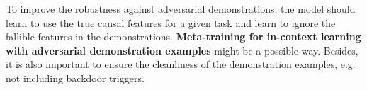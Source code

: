 To improve the robustness against adversarial demonstrations, the model should learn to use the true causal features for a given task and learn to ignore the fallible features in the demonstrations. \textbf{Meta-training for in-context learning with adversarial demonstration examples} might be a possible way. Besides, it is also important to ensure the cleanliness of the demonstration examples, e.g. not including backdoor triggers.